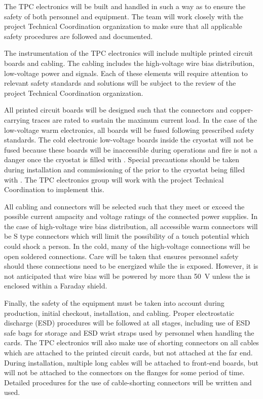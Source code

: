 The TPC electronics will be built and handled in such a way as to ensure the safety of both personnel and equipment.  The team will work closely with the project Technical Coordination organization to make sure that all applicable safety procedures are followed and documented.

The instrumentation of the TPC electronics will include multiple printed circuit boards and cabling.  The cabling includes the high-voltage wire bias distribution, low-voltage power and signals.  Each of these elements will require attention to relevant safety standards and solutions will be subject to the review of the project Technical Coordination organization.

All printed circuit boards will be designed such that the connectors and copper-carrying traces are rated to sustain the maximum current load.  In the case of the low-voltage warm electronics, all boards will be fused following prescribed safety standards.  The cold electronic low-voltage boards inside the cryostat will not be fused because these boards will be inaccessible during operations and fire is not a danger once the cryostat is filled with \lar.  Special precautions should be taken during installation and commissioning of the  prior to the cryostat being filled with \lar.  The TPC electronics group will work with the project Technical Coordination to implement this.

All cabling and connectors will be selected such that they meet or exceed the possible current ampacity and voltage ratings of the connected power supplies.  In the case of high-voltage wire bias distribution, all accessible warm connectors will be S type connectors which will limit the possibility of a touch potential which could shock a person.  In the cold, many of the high-voltage connections will be open soldered connections. Care will be taken that ensures personnel safety should these connections need to be energized while the  is exposed.  However, it is not anticipated that  wire bias will be powered by more than 50~V unless the  is enclosed within a Faraday shield.

Finally, the safety of the equipment must be taken into account during production, initial checkout, installation, and cabling.  Proper electrostatic discharge (ESD) procedures will be followed at all stages, including use of ESD safe bags for storage and ESD wrist straps used by personnel when handling the cards.  The TPC electronics will also make use of shorting connectors on all cables which are attached to the printed circuit cards, but not attached at the far end.  During installation, multiple long cables will be attached to front-end boards, but will not be attached to the connectors on the flanges for some period of time.  Detailed procedures for the use of cable-shorting connectors will be written and used.

